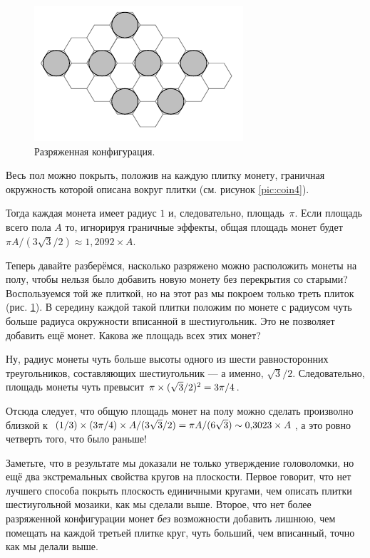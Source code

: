\begin{figure}[b!]
\centering
\includegraphics[scale=1]{pics/coin5}
\caption{Разряженная конфигурация.}
\label{pic:coin5}
\end{figure}

Весь пол можно покрыть, положив на каждую плитку монету, граничная окружность которой описана вокруг плитки (см. рисунок \ref{pic:coin4}).

Тогда каждая монета имеет радиус $1$ и, следовательно, площадь~$\pi$.
Если площадь всего пола $A$ то, игнорируя граничные эффекты, общая площадь монет будет $\pi A/(3\sqrt{3}/2)\approx 1{,}2092\times A$.

Теперь давайте разберёмся, насколько разряжено можно расположить монеты на полу, чтобы нельзя было добавить новую монету без перекрытия со старыми?
Воспользуемся той же плиткой, но на этот раз мы покроем только треть плиток (рис. \ref{pic:coin5}).
В середину каждой такой плитки положим по монете с радиусом чуть больше радиуса окружности вписанной в шестиугольник. 
Это не позволяет добавить ещё монет.
Какова же площадь всех этих монет?

Ну, радиус монеты чуть больше высоты одного из шести равносторонних треугольников, составляющих шестиугольник — а именно, $\sqrt{3}/2$.
Следовательно, площадь монеты чуть превысит $\pi \z\times (\sqrt{3}/2)^2 \z= 3\pi/4$.

Отсюда следует, что общую площадь монет на полу можно сделать произволно близкой к $(1/3) \times (3\pi/4) \times A/(3\sqrt{3}/2) = \pi A/(6 \sqrt{3}) \z\sim 0{,}3023 \times A$, а это ровно четверть того, что было раньше!

\medskip

Заметьте, что в результате мы доказали не только утверждение головоломки, но ещё два экстремальных свойства кругов на плоскости.
Первое говорит, что нет лучшего способа покрыть плоскость единичными кругами, чем описать плитки шестиугольной мозаики, как мы сделали выше.
Второе, что нет более разряженной конфигурации монет \emph{без} возможности добавить лишнюю, чем помещать на каждой третьей плитке круг, чуть больший, чем вписанный, точно как мы делали выше.

